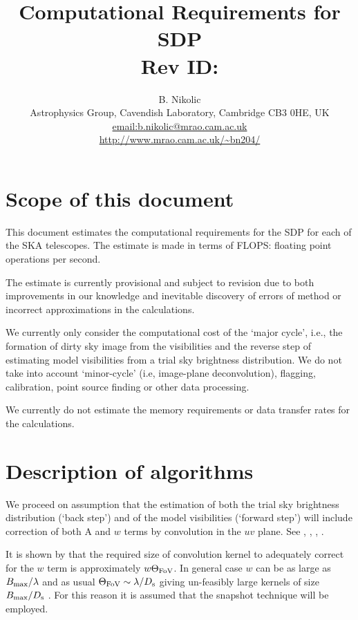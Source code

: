 \documentclass[useAMS,usenatbib,referee]{article}
\title{Computational Requirements for SDP\\
  Rev ID: }
\author{B. Nikolic\\
  Astrophysics Group, Cavendish Laboratory, Cambridge CB3 0HE, UK
  \\\url{email:b.nikolic@mrao.cam.ac.uk}
 \\\url{http://www.mrao.cam.ac.uk/~bn204/}}
\begin{document}
\maketitle

\tableofcontents

\section{Scope of this document}

This document estimates the computational requirements for the SDP for
each of the SKA telescopes. The estimate is made in terms of FLOPS:
floating point operations per second.

The estimate is currently provisional and subject to revision due to
both improvements in our knowledge and inevitable discovery of errors
of method or incorrect approximations in the calculations.

We currently only consider the computational cost of the `major
cycle', i.e., the formation of dirty sky image from the visibilities
and the reverse step of estimating model visibilities from a trial sky
brightness distribution. We do not take into account `minor-cycle'
(i.e, image-plane deconvolution), flagging, calibration, point source
finding or other data processing.

We currently do not estimate the memory requirements or data transfer
rates for the calculations.


\section{Description of algorithms}

We proceed on assumption that the estimation of both the trial sky
brightness distribution (`back step') and of the model visibilities
(`forward step') will include correction of both A and $w$ terms by
convolution in the $uv$ plane. See \cite{Cornwell2008-4703511},
\cite{Hymphreys132}, \cite{2012SPIE.8500E..0LC},
\cite{2008A&A...487..419B}.

It is shown by \cite{Hymphreys132} that the required size of
convolution kernel to adequately correct for the $w$ term is
approximately $w \Theta_{\rm FoV}$. In general case $w$ can be as
large as $B_{\rm max}/\lambda$ and as usual $\Theta_{\rm FoV} \sim
\lambda/ D_{\rm s}$ giving un-feasibly large kernels of size $B_{\rm
  max}/D_{\rm s}$ \citep[see discussion in][which is somewhat
difficult to follow but is along these lines]{Kogan2012-VLA164}. For
this reason it is assumed that the snapshot technique will be
employed.
\end{document}
